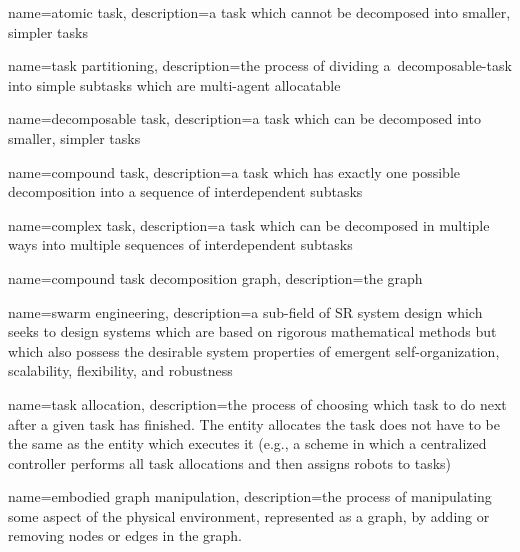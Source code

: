  {
  name={atomic task},
  description={a task which cannot be decomposed into smaller, simpler tasks}
}

 {
  name={task partitioning},
  description={the process of dividing a~\gls{decomposable-task} into simple
    subtasks which are multi-agent allocatable\cite{Ratnieks1999, Korsah2013}}
}

 {
  name={decomposable task},
  description={a task which can be decomposed into smaller, simpler tasks}
}

{
  name={compound task},
  description={a task which has exactly one possible decomposition into
    a sequence of interdependent subtasks}
}

{
  name={complex task},
  description={a task which can be decomposed in multiple ways into multiple
    sequences of interdependent subtasks
  }
}

{
  name={compound task decomposition graph},
  description={the graph }
}

{
  name={swarm engineering},
  description={a sub-field of SR system design which seeks to
    design systems which are based on rigorous mathematical methods but which
    also possess the desirable system properties of emergent self-organization,
    scalability, flexibility, and robustness } }

{
  name={task allocation},
  description={the process of choosing which task to do next after a given task
    has finished. The entity allocates the task does not have to be the same as
    the entity which executes it (e.g., a scheme in which a centralized
    controller performs all task allocations and then assigns robots to tasks)
  }
}

{
  name={embodied graph manipulation},
  description={the process of manipulating some aspect of the physical
    environment, represented as a graph, by adding or removing nodes or edges in
    the graph.}
}
